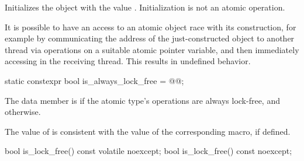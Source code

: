 \begin{itemdescr}
\pnum
\effects
Initializes the object with the value .
Initialization is not an atomic operation.
\begin{note}
It is possible to have an access to an atomic object 
race with its construction, for example by communicating the address of the
just-constructed object  to another thread via
 operations on a suitable atomic pointer
variable, and then immediately accessing  in the receiving thread.
This results in undefined behavior.
\end{note}
\end{itemdescr}

%
%
%
%
%
%
\begin{itemdecl}
static constexpr bool is_always_lock_free = @@;
\end{itemdecl}

\begin{itemdescr}
\pnum
The  data member  is 
if the atomic type's operations are always lock-free, and  otherwise.
\begin{note}
The value of  is consistent with the value of
the corresponding  macro, if defined.
\end{note}
\end{itemdescr}

%
%
%
%
%
%
%
\begin{itemdecl}
bool is_lock_free() const volatile noexcept;
bool is_lock_free() const noexcept;
\end{itemdecl}

